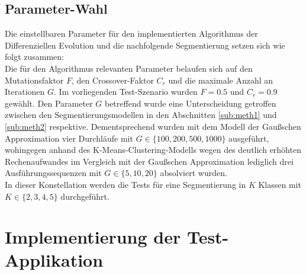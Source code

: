 		\subsection{Parameter-Wahl}
		\label{sub:de-params}
			Die einstellbaren Parameter für den implementierten Algorithmus der Differenziellen Evolution und die nachfolgende Segmentierung setzen sich wie folgt zusammen:\\
			Die für den Algorithmus relevanten Parameter belaufen sich auf den Mutationsfaktor $F$, den Crossover-Faktor $C_{r}$ und die maximale Anzahl an Iterationen $G$. Im vorliegenden Test-Szenario wurden $F = 0.5$ und $C_{r} = 0.9$ gewählt. Den Parameter $G$ betreffend wurde eine Unterscheidung getroffen zwischen den Segmentierungsmodellen in den Abschnitten \ref{sub:meth1} und \ref{sub:meth2} respektive. Dementsprechend wurden mit dem Modell der Gaußschen Approximation vier Durchläufe mit $G \in \{100, 200, 500, 1000\}$ ausgeführt, wohingegen anhand des K-Means-Clustering-Modells wegen des deutlich erhöhten Rechenaufwandes im Vergleich mit der Gaußschen Approximation lediglich drei Ausführungssequenzen mit $G \in \{5, 10, 20\}$ absolviert wurden.\\
			In dieser Konstellation werden die Tests für eine Segmentierung in $K$ Klassen mit $K \in \{2,3,4,5\}$ durchgeführt.

	\section{Implementierung der Test-Applikation}
	\label{sec:implementation}
